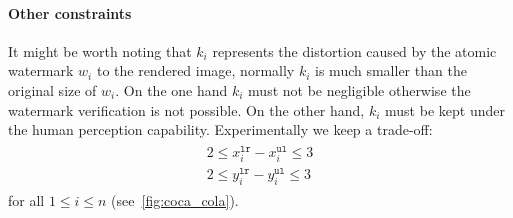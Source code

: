 \documentclass[a4paper,11pt,onecolumn]{memoir}
\begin{document}
\paragraph[Other constraints]{Other constraints}
It might be worth noting that $k_i$ represents the distortion caused by the atomic watermark $w_i$ to the rendered image, normally $k_i$ is much smaller than the original size of $w_i$. On the one hand $k_i$ must not be negligible otherwise the watermark verification is not possible. On the other hand, $k_i$ must be kept under the human perception capability. Experimentally we keep a trade-off:
\begin{align}\label{eq:side_constraint}
\begin{split}
    2 \leq x^{\mathtt{lr}}_{i} - x^{\mathtt{ul}}_{i} \leq 3 \\
    2 \leq y^{\mathtt{lr}}_{i} - y^{\mathtt{ul}}_{i} \leq 3
\end{split}
\end{align}
for all $1 \leq i \leq n$ (see~\autoref{fig:coca_cola}).
\end{document}
